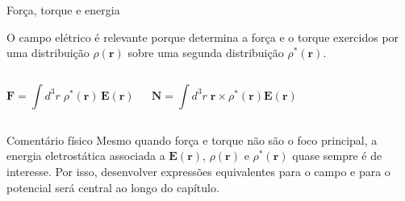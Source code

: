 \documentclass[aspectratio=169,11pt]{beamer}
\newcommand{\E}{\mathbf{E}}
\newcommand{\F}{\mathbf{F}}
\newcommand{\N}{\mathbf{N}}
\newcommand{\rr}{\mathbf{r}}
\begin{document}
\begin{frame}{Força, torque e energia}
\begin{mybox}
\justifying
O campo elétrico é relevante porque determina a força e o torque exercidos por uma distribuição \(\rho(\rr)\) sobre uma segunda distribuição \(\rho^\ast(\rr)\).
\end{mybox}

\vspace{0.25cm}

\begin{columns}[T,onlytextwidth]
\begin{eqbox}
\begin{equation}
\F=\int d^3r\;\rho^\ast(\rr)\,\E(\rr)
\label{eq:3.3}
\end{equation}
\end{eqbox}

\begin{eqbox}
\begin{equation}
\N=\int d^3r\;\rr\times \rho^\ast(\rr)\E(\rr)
\label{eq:3.4}
\end{equation}
\end{eqbox}
\end{columns}

\vspace{0.25cm}

\begin{block}{Comentário físico}
\justifying
Mesmo quando força e torque não são o foco principal, a \alert{energia eletrostática} associada a \(\E(\rr)\), \(\rho(\rr)\) e \(\rho^\ast(\rr)\) quase sempre é de interesse. 
Por isso, desenvolver expressões equivalentes para o campo e para o potencial será central ao longo do capítulo.
\end{block}
\end{frame}
\end{document}
